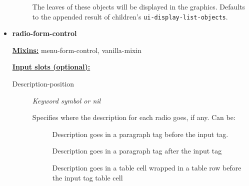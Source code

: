 \documentclass [11pt]{book}
\begin{document}
\begin{itemize}
\begin{description}
 The leaves of these objects will be
displayed in the graphics. Defaults to the appended result of children's
\texttt{ui-display-list-objects}.




\end{description}







\item {}
\label{prim:radio-form-control}
\textbf{radio-form-control}


\textbf{
\underline{Mixins:}} menu-form-control, vanilla-mixin





\begin{description}

\end{description}








\textbf{
\underline{Input slots (optional):}}

\begin{description}

\item [Description-position]
\emph{Keyword symbol or nil}

 Specifies where the description for each radio goes, if any.
Can be:


\begin{description}


\item[
]

Description goes in a paragraph tag before the input tag.


\item[
]

Description goes in a paragraph tag after the input tag


\item[
]

Description goes in a table cell wrapped in a table row before the input tag table cell


\item[
]


\end{description}
\end{description}
\end{itemize}
\end{document}
